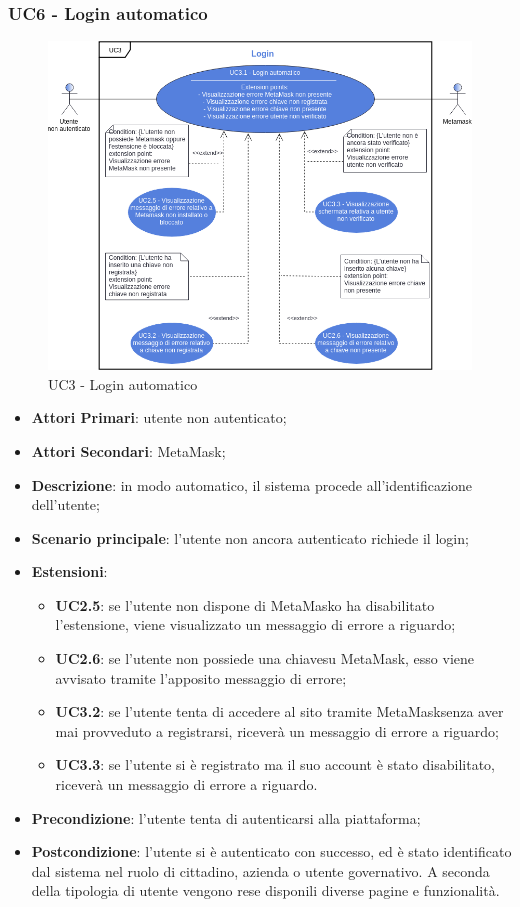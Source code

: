 \subsubsection{UC6 - Login automatico}
\begin{figure}[h]
	\includegraphics[width=12cm]{res/images/UC3Login.png} %
	\centering
	\caption{UC3 - Login automatico}
	
\end{figure}
\begin{itemize}
	\item \textbf{Attori Primari}:
	utente non autenticato;
	\item \textbf{Attori Secondari}:
	MetaMask\glo;
	\item \textbf{Descrizione}:
	in modo automatico, il sistema procede all'identificazione dell'utente;
	\item \textbf{Scenario principale}:
	l'utente non ancora autenticato richiede il login;
	\item \textbf{Estensioni}:
	\begin{itemize}
		\item \textbf{UC2.5}: se l'utente non dispone di MetaMask\glosp o ha disabilitato l'estensione, viene visualizzato un messaggio di errore a riguardo;
		\item \textbf{UC2.6}: se l'utente non possiede una chiave\glosp su MetaMask\glo, esso viene avvisato tramite l'apposito messaggio di errore;
		\item \textbf{UC3.2}: se l'utente tenta di accedere al sito tramite MetaMask\glosp senza aver mai provveduto a registrarsi, riceverà un messaggio di errore a riguardo;
		
		\item \textbf{UC3.3}: se l'utente si è registrato ma il suo account è stato disabilitato, riceverà un messaggio di errore a riguardo.
	\end{itemize}
	\item \textbf{Precondizione}:
	l'utente tenta di autenticarsi alla piattaforma;
	\item \textbf{Postcondizione}:
	l'utente si è autenticato con successo, ed è stato identificato dal sistema nel ruolo di cittadino, azienda o utente governativo. A seconda della tipologia di utente vengono rese disponili diverse pagine e funzionalità.
\end{itemize}
